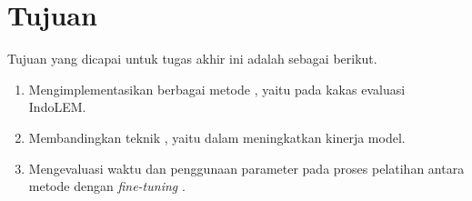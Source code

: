 \section{Tujuan}
\label{sec:tujuan}

Tujuan yang  dicapai untuk tugas akhir ini adalah sebagai berikut.

\begin{enumerate}
    \item Mengimplementasikan berbagai metode \PEFT, yaitu \methodPEFT pada kakas evaluasi IndoLEM.
    \item Membandingkan teknik \PEFT, yaitu \methodPEFT dalam meningkatkan kinerja model.
    \item Mengevaluasi waktu dan penggunaan parameter pada proses pelatihan antara metode \PEFT dengan \textit{fine-tuning} .
\end{enumerate}
